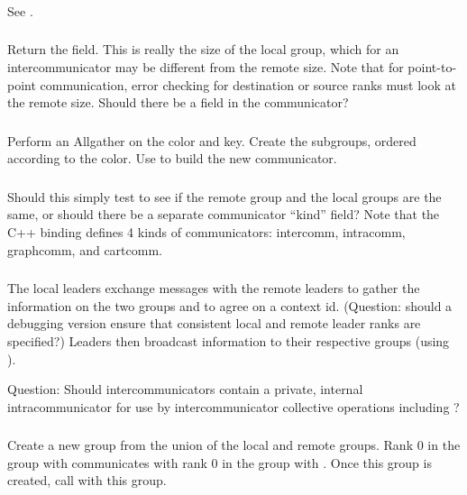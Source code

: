 \documentclass{article}
\begin{document}
\subsubsection{}
See .

\subsubsection{}
Return the  field.  This is really the size of the local
group, which for an intercommunicator may be different from the remote
size.  Note that for point-to-point communication, error checking for
destination or source ranks must look at the remote size.  Should
there be a  field in the communicator?

\subsubsection{}
Perform an Allgather on the color and key.  Create the subgroups,
ordered according to the color.  Use  to
build the new communicator.

\subsubsection{}
Should this simply test to see if the remote group and the local groups are
the same, or should there be a separate communicator ``kind'' field?  Note
that the C++ binding defines 4 kinds of communicators: intercomm, intracomm,
graphcomm, and cartcomm. 

\subsubsection{}
The local leaders exchange messages with the remote leaders to gather the
information on the two groups and to agree on a context id.  (Question: should
a debugging version ensure 
that consistent local and remote leader ranks are specified?)  
Leaders then broadcast information to their respective groups (using
). 

Question:  Should intercommunicators contain a private, internal
intracommunicator for use by intercommunicator collective operations including
?

\subsubsection{}
Create a new group from the union of the local and remote groups.  Rank 0 in
the group with  communicates with rank 0 in the group with
.  Once this group is created, call
 with this group.
\end{document}
